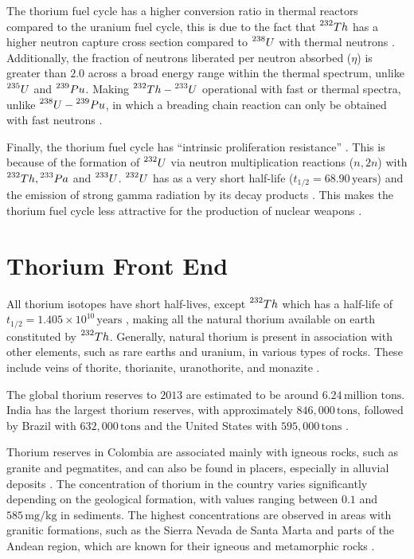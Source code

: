The thorium fuel cycle has a higher conversion ratio in thermal reactors compared to the uranium fuel cycle, this is due to the fact that \(\prescript{232}{}{Th}\) has a higher neutron capture cross section compared to \(\prescript{238}{}{U}\) with thermal neutrons \cite{IAEA_Th_Potential}. Additionally, the fraction of neutrons liberated per neutron absorbed (\(\eta\)) is greater than \(2.0\) across a broad energy range within the thermal spectrum, unlike \(\prescript{235}{}{U}\) and \(\prescript{239}{}{Pu}\). Making \(\prescript{232}{}{Th} - \prescript{233}{}{U}\) operational with fast or thermal spectra, unlike \(\prescript{238}{}{U} - \prescript{239}{}{Pu}\), in which a breading chain reaction can only be obtained with fast neutrons \cite{IAEA_Th_Potential}.

Finally, the thorium fuel cycle has ``intrinsic proliferation resistance'' \cite{IAEA_Th_Potential}. This is because of the formation of \(\prescript{232}{}{U}\) via neutron multiplication reactions (\(n,2n\)) with \(\prescript{232}{}{Th}, \prescript{233}{}{Pa}\) and \(\prescript{233}{}{U}\). \(\prescript{232}{}{U}\) has as a very short half-life (\(t_{1/2} = 68.90 \, \text{years} \)) and the emission of strong gamma radiation by its decay products \cite{IAEA_Th_Potential,NNDC}. This makes the thorium fuel cycle less attractive for the production of nuclear weapons \cite{IAEA_Th_Potential}.

\section{Thorium Front End}

All thorium isotopes have short half-lives, except \(\prescript{232}{}{Th}\) which has a half-life of \(t_{1/2} = 1.405 \times 10^{10} \, \text{years}\) \cite{NNDC}, making all the natural thorium available on earth constituted by \(\prescript{232}{}{Th}\). Generally, natural thorium is present in association with other elements, such as rare earths and uranium, in various types of rocks. These include veins of thorite, thorianite, uranothorite, and monazite \cite{IAEA_Th_Potential}. 

The global thorium reserves to \(2013\) are estimated to be around \(6.24 \, \text{million tons}\). India has the largest thorium reserves, with approximately \(846,000 \, \text{tons}\), followed by Brazil with \(632,000 \, \text{tons}\) and the United States with \(595,000 \, \text{tons}\) \cite{Th_cycle_viability}.

Thorium reserves in Colombia are associated mainly with igneous rocks, such as granite and pegmatites, and can also be found in placers, especially in alluvial deposits \cite{Th_Colombia}. The concentration of thorium in the country varies significantly depending on the geological formation, with values ranging between \(0.1\) and \(585 \, \text{mg}/\text{kg}\) in sediments. The highest concentrations are observed in areas with granitic formations, such as the Sierra Nevada de Santa Marta and parts of the Andean region, which are known for their igneous and metamorphic rocks \cite{Th_Colombia}. 

